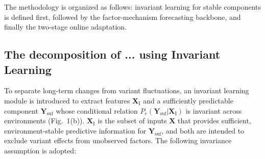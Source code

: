﻿\documentclass[journal]{IEEEtran}
\newenvironment{auditproblemblock}{\begingroup\color{red}}{\endgroup}
\begin{document}
\begin{auditproblemblock}

The methodology is organized as follows: invariant learning for stable components is defined first, followed by the factor-mechanism forecasting backbone, and finally the two-stage online adaptation.
\end{auditproblemblock}

\begin{auditproblemblock}
\subsection{The decomposition of ... using Invariant Learning}
\end{auditproblemblock}
To separate long-term changes from variant fluctuations, an invariant learning module is introduced to extract features $\mathbf{X}_{\mathrm{I}}$ and a sufficiently predictable component $\mathbf{Y}_{\mathrm{suf}}$ whose conditional relation $P_e(\mathbf{Y}_{\mathrm{suf}}|\mathbf{X}_{\mathrm{I}})$ is invariant across environments (Fig.~1(b)). $\mathbf{X}_{\mathrm{I}}$ is the subset of inputs $\mathbf{X}$ that provides sufficient, environment-stable predictive information for $\mathbf{Y}_{\mathrm{suf}}$, and both are intended to exclude variant effects from unobserved factors. The following invariance assumption is adopted:
\end{document}
